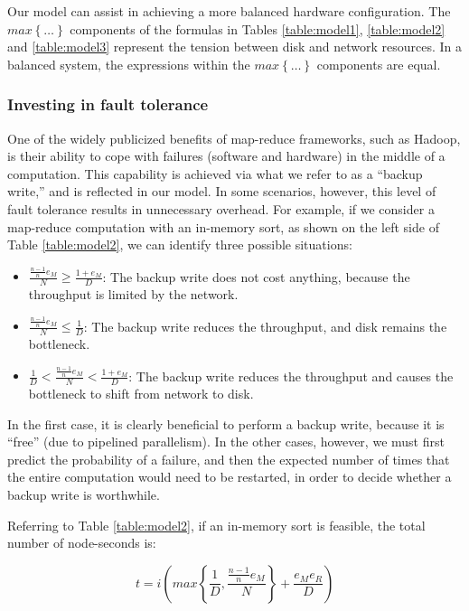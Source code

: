 \documentclass[ 11pt, letterpaper]{article}%
\begin{document}
Our model can assist in achieving a more balanced
hardware configuration. The $max\left\{\ldots\right\}$ components of the
formulas in Tables \ref{table:model1}, \ref{table:model2} and
\ref{table:model3} represent the tension between disk and network resources. In
a balanced system, the expressions within the $max\left\{\ldots\right\}$
components are equal.
\subsubsection{Investing in fault tolerance}

One of the widely publicized benefits of map-reduce frameworks, such as Hadoop,
is their ability to cope with failures (software and hardware) in the middle of
a computation. This capability is achieved via what we refer to as a ``backup
write,'' and is reflected in our model. In some scenarios, however, this level
of fault tolerance results in unnecessary overhead. For example, if we consider
a map-reduce computation with an in-memory sort, as shown on the left side of
Table \ref{table:model2}, we can identify three possible situations:

\begin{itemize}
  \item $\frac{\frac{n-1}{n} e_M}{N} \ge \frac{1+e_M}{D}$: The backup write does
  not cost anything, because the throughput is limited by the network.
  \item $\frac{\frac{n-1}{n} e_M}{N} \le \frac{1}{D}$: The backup write reduces
  the throughput, and disk remains the bottleneck.
  \item $\frac{1}{D} < \frac{\frac{n-1}{n} e_M}{N} < \frac{1+e_M}{D}$: The
  backup write reduces the throughput and causes the bottleneck to shift from
  network to disk.
\end{itemize}

In the first case, it is clearly beneficial to perform a backup write, because
it is ``free'' (due to pipelined parallelism). In the other cases, however, we
must first predict the probability of a failure, and then the expected number
of times that the entire computation would need to be restarted, in order to
decide whether a backup write is worthwhile.

Referring to Table \ref{table:model2}, if an in-memory sort is feasible, the
total number of node-seconds is:

\begin{equation*}
t = i \left( max\left\{\frac{1}{D},
\frac{\frac{n-1}{n} e_M}{N}\right\} + \frac{e_M e_R}{D} \right)
\end{equation*}
\end{document}

